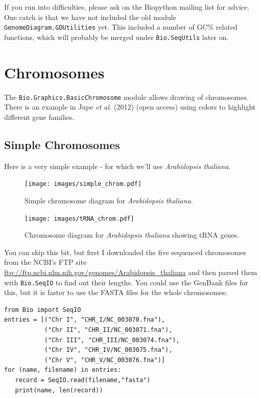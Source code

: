 \documentclass{report}
\begin{document}
If you run into difficulties, please ask on the Biopython mailing list for
advice. One catch is that we have not included the old module
\verb|GenomeDiagram.GDUtilities| yet.  This included a number of
GC\% related functions, which will probably be merged under
\verb|Bio.SeqUtils| later on.

\section{Chromosomes}

The \verb|Bio.Graphics.BasicChromosome| module allows drawing of chromosomes.
There is an example in Jupe \textit{et al.} (2012) \cite{jupe2012}
(open access) using colors to highlight different gene families.

\subsection{Simple Chromosomes}
Here is a very simple example - for which we'll use \textit{Arabidopsis thaliana}.

\begin{latexonly}
\begin{figure}[p]
\centering
\texttt{[image: images/simple\_chrom.pdf]}
\caption{Simple chromosome diagram for \textit{Arabidopsis thaliana}.}
\label{fig:simplechromosome}
\end{figure}
\begin{figure}[p]
\centering
\texttt{[image: images/tRNA\_chrom.pdf]}
\caption{Chromosome diagram for \textit{Arabidopsis thaliana} showing tRNA genes.}
\label{fig:trnachromosome}
\end{figure}
\end{latexonly}

You can skip this bit, but first I downloaded the five sequenced chromosomes
from the NCBI's FTP site
\url{ftp://ftp.ncbi.nlm.nih.gov/genomes/Arabidopsis_thaliana} and then parsed
them with \verb|Bio.SeqIO| to find out their lengths.  You could use the
GenBank files for this, but it is faster to use the FASTA files for the
whole chromosomes:

\begin{verbatim}
from Bio import SeqIO
entries = [("Chr I", "CHR_I/NC_003070.fna"),
           ("Chr II", "CHR_II/NC_003071.fna"),
           ("Chr III", "CHR_III/NC_003074.fna"),
           ("Chr IV", "CHR_IV/NC_003075.fna"),
           ("Chr V", "CHR_V/NC_003076.fna")]
for (name, filename) in entries:
   record = SeqIO.read(filename,"fasta")
   print(name, len(record))
\end{verbatim}
\end{document}
